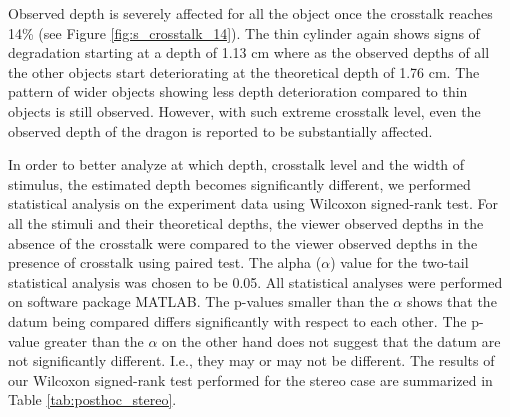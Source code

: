 Observed depth is severely affected for all the object once the crosstalk reaches 14\% (see Figure \ref{fig:s_crosstalk_14}). The thin cylinder again shows signs of degradation starting at a depth of 1.13 cm where as the observed depths of all the other objects start deteriorating at the theoretical depth of 1.76 cm. The pattern of wider objects showing less depth deterioration compared to thin objects is still observed. However, with such extreme crosstalk level, even the observed depth of the dragon is reported to be substantially affected.

In order to better analyze at which depth, crosstalk level and the width of stimulus, the estimated depth becomes significantly different, we performed statistical analysis on the experiment data using Wilcoxon signed-rank test. For all the stimuli and their theoretical depths, the viewer observed depths in the absence of the crosstalk were compared to the viewer observed depths in the presence of crosstalk using paired test. The alpha ($\alpha$) value for the two-tail statistical analysis was chosen to be 0.05. All statistical analyses were performed on software package MATLAB. The p-values smaller than the $\alpha$ shows that the datum being compared differs significantly with respect to each other. The p-value greater than the $\alpha$ on the other hand does not suggest that the datum are not significantly different. I.e., they may or may not be different. The results of our Wilcoxon signed-rank test performed for the stereo case are summarized in Table \ref{tab:posthoc_stereo}. 

